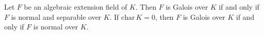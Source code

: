 Let $F$ be an algebraic extension field of $K$. Then $F$ is Galois over $K$ if and only if $F$ is normal and separable over $K$. If $\mathrm{char}\,K = 0$, then $F$ is Galois over $K$ if and only if $F$ is normal over $K$.
